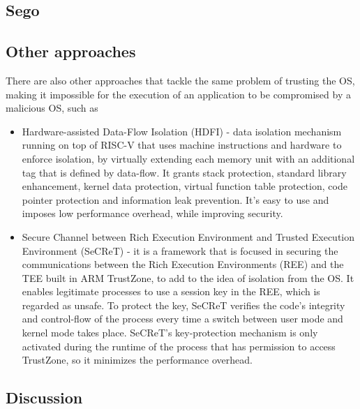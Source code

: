 \subsection{Sego}
\label{ssec:sego}



\subsection{Other approaches}
\label{ssec:tee_other_frameworks}

There are also other approaches that tackle the same problem of trusting the OS, making it impossible for the execution of an  application to be compromised by a malicious OS, such as 

\begin{itemize}
	\item Hardware-assisted Data-Flow Isolation (HDFI) \cite{hdfiPaper} - data isolation mechanism running on top of RISC-V that uses machine instructions and hardware to enforce isolation, by virtually extending each memory unit with an additional tag that is defined by data-flow. It grants stack protection, standard library enhancement, kernel data protection, virtual function table protection, code pointer protection and information leak prevention. It's easy to use and imposes low performance overhead, while improving security.
	
	\item Secure Channel between Rich Execution Environment and Trusted Execution Environment (SeCReT) \cite{secretPaper} - it is a framework that is focused in securing the communications between the Rich Execution Environments (REE) and the TEE built in ARM TrustZone, to add to the idea of isolation from the OS. It enables legitimate processes to use a session key in the REE, which is regarded as unsafe. To protect the key, SeCReT verifies the code's integrity and control-flow of the process every time a switch between user mode and kernel mode takes place. SeCReT's key-protection mechanism is only activated during the runtime of the process that has permission to access TrustZone, so it minimizes the performance overhead.
	
	
\end{itemize}



\subsection{Discussion}
\label{ssec:tee_frameworks_discussion}


